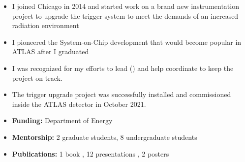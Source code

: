 \begin{itemize}
	\setlength{\itemsep}{0em}
	\item I joined Chicago in 2014 and started work on a brand new instrumentation project to upgrade the trigger system to meet the demands of an increased radiation environment
	\item I pioneered the System-on-Chip development that would become popular in ATLAS after I graduated
	\item I was recognized for my efforts to lead () and help coordinate to keep the project on track.
	\item The trigger upgrade project was successfully installed and commissioned inside the ATLAS detector in October 2021.
	\item \textbf{Funding:} Department of Energy
	\item \textbf{Mentorship:} 2 graduate students, 8 undergraduate students
	\item \textbf{Publications:} 1 book , 12 presentations , 2 posters 
\end{itemize}

\\


